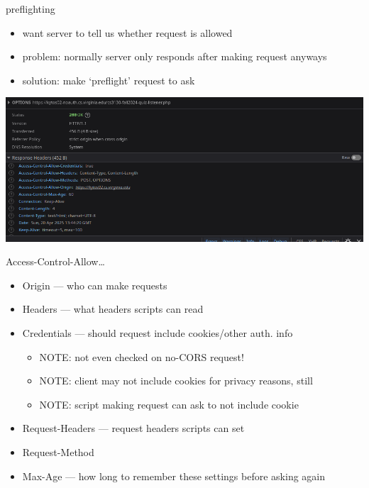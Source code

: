 \begin{frame}{preflighting}
    \begin{itemize}
    \item want server to tell us whether request is allowed
    \item problem: normally server only responds after making request anyways
    \vspace{.5cm}
    \item solution: make `preflight' request to ask
    \end{itemize}
\includegraphics[height=0.5\textheight]{../web/cors-preflight-ex}
\end{frame}

\begin{frame}{Access-Control-Allow\ldots}
    \begin{itemize}
    \item Origin --- who can make requests
    \item Headers --- what headers scripts can read
    \item Credentials --- should request include cookies/other auth. info
        \begin{itemize}
        \item NOTE: not even checked on no-CORS request!
        \item NOTE: client may not include cookies for privacy reasons, still
        \item NOTE: script making request can ask to not include cookie
        \end{itemize}
    \item Request-Headers --- request headers scripts can set
    \item Request-Method
    \item Max-Age --- how long to remember these settings before asking again
    \end{itemize}
\end{frame}


